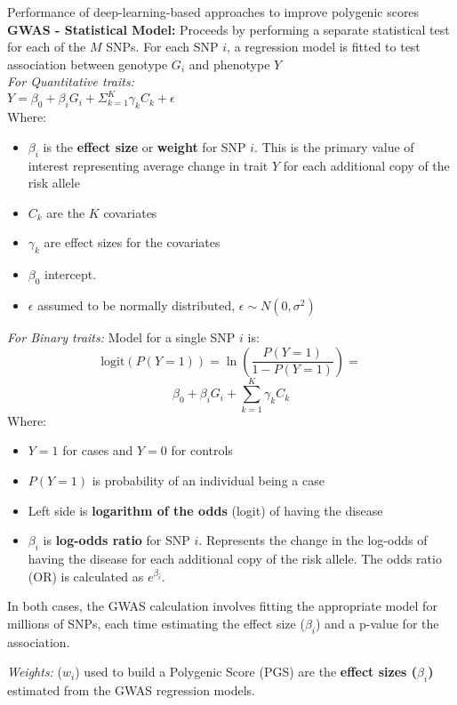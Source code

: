 \documentclass[twocolumn]{article}
\begin{document}
\begin{literaturepaper}{Performance of deep-learning-based approaches to improve polygenic scores \cite{Kelemen2025PolygenicScores}}
\textbf{GWAS - Statistical Model:} Proceeds by performing a separate statistical test for each of the $M$ SNPs. For each SNP $i$, a regression model is fitted to test association between genotype $G_i$ and phenotype $Y$\\

\textit{For Quantitative traits:}\\

$Y = \beta_0+\beta_i G_i + \Sigma^K_{k=1}\gamma_k C_k + \epsilon$\\

Where:
\begin{itemize}
    \item $\beta_i$ is the \textbf{effect size} or \textbf{weight} for SNP $i$. This is the primary value of interest representing average change in trait $Y$ for each additional copy of the risk allele
    \item $C_k$ are the $K$ covariates
    \item $\gamma_k$ are effect sizes for the covariates
    \item $\beta_0$ intercept.
    \item $\epsilon$ assumed to be normally distributed, $\epsilon \sim N(0, \sigma^2)$
\end{itemize}

\textit{For Binary traits:} Model for a single SNP $i$ is:
\[
\text{logit}(P(Y=1)) = \ln\left( \frac{P(Y=1)}{1 - P(Y=1)} \right) =\] 
\[
\beta_0 + \beta_i G_i + \sum_{k=1}^{K} \gamma_k C_k
\]
Where:
\begin{itemize}
    \item $Y=1$ for cases and $Y=0$ for controls
    \item $P(Y=1)$ is probability of an individual being a case
    \item Left side is \textbf{logarithm of the odds} (logit) of having the disease
    \item $\beta_i$ is \textbf{log-odds ratio} for SNP $i$. Represents the change in the log-odds of having the disease for each additional copy of the risk allele. The odds ratio (OR) is calculated as $e^{\beta_i}$.
\end{itemize}
In both cases, the GWAS calculation involves fitting the appropriate model for millions of SNPs, each time estimating the effect size ($\beta_i$) and a p-value for the association.

\textit{Weights:} ($w_i$) used to build a Polygenic Score (PGS) are the \textbf{effect sizes ($\beta_i$)} estimated from the GWAS regression models.


\end{literaturepaper}
\end{document}

